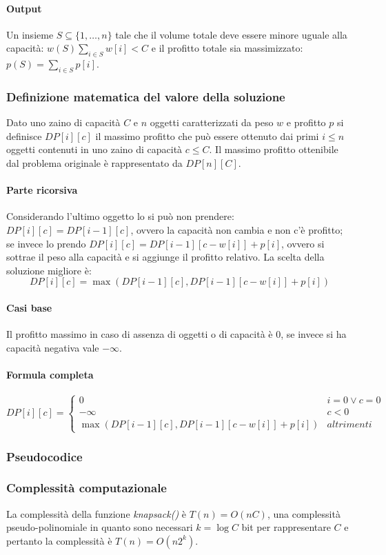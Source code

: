 \paragraph{Output}
Un insieme $S\subseteq\{1,\dots, n\}$ tale che il volume totale deve essere minore uguale alla capacit\`a: $w(S)\sum\limits_{i\in S}w[i]<C$ e il profitto
totale sia massimizzato: $p(S)=\sum\limits_{i\in S}p[i]$.
\subsubsection{Definizione matematica del valore della soluzione}
Dato uno zaino di capacit\`a $C$ e $n$ oggetti caratterizzati da peso $w$ e profitto $p$ si definisce $DP[i][c]$ il massimo profitto che pu\`o essere 
ottenuto dai primi $i\le n$ oggetti contenuti in uno zaino di capacit\`a $c\le C$. Il massimo profitto ottenibile dal problema originale \`e rappresentato
da $DP[n][C]$.
\paragraph{Parte ricorsiva}
Considerando l'ultimo oggetto lo si pu\`o non prendere: $DP[i][c]=DP[i-1][c]$, ovvero la capacit\`a non cambia e non c'\`e profitto; se invece lo prendo
$DP[i][c]=DP[i-1][c-w[i]]+p[i]$, ovvero si sottrae il peso alla capacit\`a e si aggiunge il profitto relativo. La scelta della soluzione migliore \`e:
$$DP[i][c] = \max(DP[i-1][c], DP[i-1][c-w[i]]+p[i])$$
\paragraph{Casi base}
Il profitto massimo in caso di assenza di oggetti o di capacit\`a \`e $0$, se invece si ha capacit\`a negativa vale $-\infty$. 
\paragraph{Formula completa}
$$
DP[i][c] =
\begin{cases}
0\quad & i = 0 \lor c = 0\\
-\infty & c<0\\
\max(DP[i-1][c], DP[i-1][c-w[i]]+p[i]) & altrimenti
\end{cases}
$$
\subsubsection{Pseudocodice}

\subsubsection{Complessit\`a computazionale}
La complessit\`a della funzione \emph{knapsack()} \`e $T(n) = O(nC)$, una complessit\`a pseudo-polinomiale in quanto sono necessari $k = \log C$ bit per 
rappresentare $C$ e pertanto la complessit\`a \`e $T(n) = O(n2^k)$.
